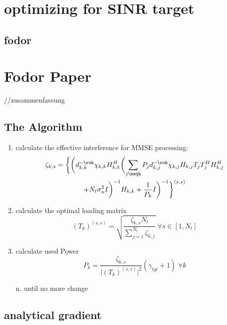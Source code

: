 \section{optimizing for SINR target}
\subsection{fodor}

\section{Fodor Paper}
//zusammenfassung

\subsection{The Algorithm}
\begin{enumerate}
	\item calculate the effective interference for MMSE processing:
		\begin{multline}
			\zeta_{k,s} = \biggl\{\biggl(d^{-\roh}_{k,k}\chi_{k,k}H^H_{k,k}\biggl(\sum_{j\neqk}{P_jd^{-\roh}_{k,j}\chi_{k,j}H_{k,j}T_jT_j^HH^H_{k,j}}\\
			+N_t\sigma^2_nI\biggr)^{-1}H_{k,k}+\frac{1}{P_k}I\biggr)^{-1}\biggr\}^{(s,s)}
		\end{multline}

	\item calculate the optimal loading matrix
		\begin{equation}
			(T_k)^{(s,s)} = \sqrt{\frac{\zeta_{k,s}N_t}{\sum_{j=1}^{N_t}\zeta_{k,j}}}\;\forall s\in[1,N_t]
		\end{equation}

	\item calculate used Power
		\begin{equation}
			P_k = \frac{\zeta_{k,s}}{\vert(T_k)^{(s,s)}\vert^2}(\gamma_{tgt}+1)\;\forall k
		\end{equation}

	\item[n.] until no more change

\end{enumerate}

\subsection{analytical gradient}
